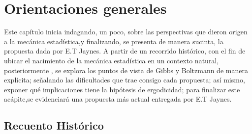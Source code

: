 \chapter{Orientaciones generales}

Este capítulo inicia indagando, un poco, sobre las perspectivas que dieron origen a la mecánica estadística,y finalizando, se presenta de manera sucinta, la propuesta dada por E.T Jaynes. A  partir  de un recorrido histórico, con el fin de ubicar el nacimiento de la mecánica estadística en un contexto natural, posteriormente , se explora los puntos de vista de Gibbs y Boltzmann de manera explícita; señalando las dificultades que trae consigo cada propuesta; así mismo, exponer qué implicaciones tiene la hipótesis de ergodicidad; para finalizar este acápite,se evidenciará una propuesta más actual entregada por E.T Jaynes.

\section{Recuento Histórico}

